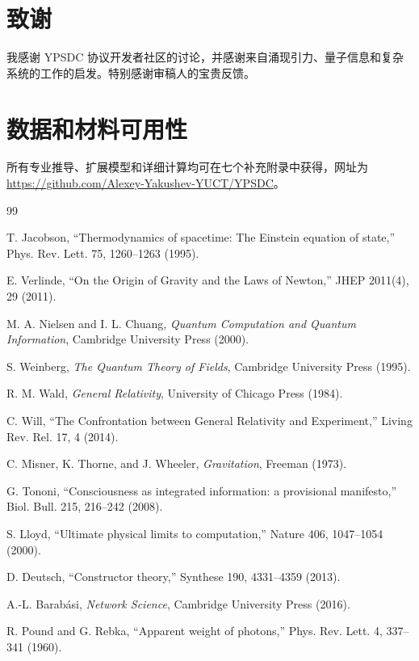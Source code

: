 \documentclass[11pt,a4paper]{article}
\begin{document}
	\section*{致谢}
	我感谢 YPSDC 协议开发者社区的讨论，并感谢来自涌现引力、量子信息和复杂系统的工作的启发。特别感谢审稿人的宝贵反馈。
	
	\section*{数据和材料可用性}
	所有专业推导、扩展模型和详细计算均可在七个补充附录中获得，网址为 \url{https://github.com/Alexey-Yakushev-YUCT/YPSDC}。
	
	\begin{thebibliography}{99}
		
		 T. Jacobson, ``Thermodynamics of spacetime: The Einstein equation of state,'' Phys. Rev. Lett. 75, 1260–1263 (1995).
		
		 E. Verlinde, ``On the Origin of Gravity and the Laws of Newton,'' JHEP 2011(4), 29 (2011).
		
		 M. A. Nielsen and I. L. Chuang, \emph{Quantum Computation and Quantum Information}, Cambridge University Press (2000).
		
		 S. Weinberg, \emph{The Quantum Theory of Fields}, Cambridge University Press (1995).
		
		 R. M. Wald, \emph{General Relativity}, University of Chicago Press (1984).
		
		 C. Will, ``The Confrontation between General Relativity and Experiment,'' Living Rev. Rel. 17, 4 (2014).
		
		 C. Misner, K. Thorne, and J. Wheeler, \emph{Gravitation}, Freeman (1973).
		
		 G. Tononi, ``Consciousness as integrated information: a provisional manifesto,'' Biol. Bull. 215, 216–242 (2008).
		
		 S. Lloyd, ``Ultimate physical limits to computation,'' Nature 406, 1047–1054 (2000).
		
		 D. Deutsch, ``Constructor theory,'' Synthese 190, 4331–4359 (2013).
		
		 A.-L. Barabási, \emph{Network Science}, Cambridge University Press (2016).
		
		 R. Pound and G. Rebka, ``Apparent weight of photons,'' Phys. Rev. Lett. 4, 337–341 (1960).
		

\end{thebibliography}
\end{document}
